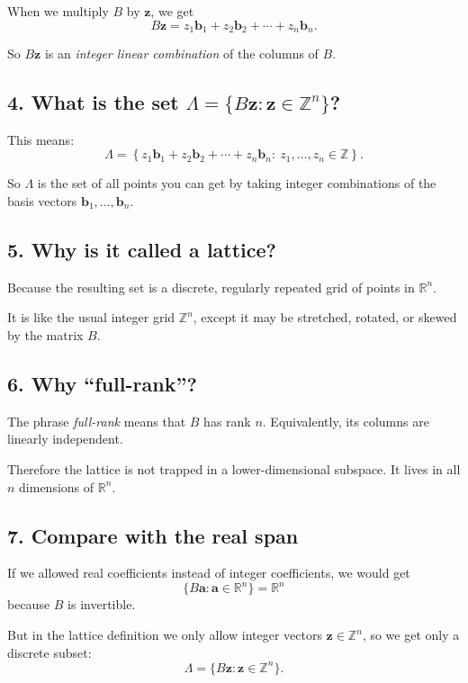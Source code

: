 \documentclass[12pt]{article}
\begin{document}
	When we multiply \(B\) by \(\mathbf{z}\), we get
	\[
	B\mathbf{z}
	=
	z_1\mathbf{b}_1+z_2\mathbf{b}_2+\cdots+z_n\mathbf{b}_n.
	\]
	
	So \(B\mathbf{z}\) is an \emph{integer linear combination} of the columns of \(B\).
	
	\subsection*{4. What is the set \(\Lambda=\{B\mathbf{z}:\mathbf{z}\in\mathbb{Z}^n\}\)?}
	
	This means:
	\[
	\Lambda
	=
	\left\{
	z_1\mathbf{b}_1+z_2\mathbf{b}_2+\cdots+z_n\mathbf{b}_n
	:\ z_1,\dots,z_n\in\mathbb{Z}
	\right\}.
	\]
	
	So \(\Lambda\) is the set of all points you can get by taking integer combinations of the basis vectors \(\mathbf{b}_1,\dots,\mathbf{b}_n\).
	
	\subsection*{5. Why is it called a lattice?}
	
	Because the resulting set is a discrete, regularly repeated grid of points in \(\mathbb{R}^n\).
	
	It is like the usual integer grid \(\mathbb{Z}^n\), except it may be stretched, rotated, or skewed by the matrix \(B\).
	
	\subsection*{6. Why ``full-rank''?}
	
	The phrase \emph{full-rank} means that \(B\) has rank \(n\). Equivalently, its columns are linearly independent.
	
	Therefore the lattice is not trapped in a lower-dimensional subspace. It lives in all \(n\) dimensions of \(\mathbb{R}^n\).
	
	\subsection*{7. Compare with the real span}
	
	If we allowed real coefficients instead of integer coefficients, we would get
	\[
	\{B\mathbf{a}:\mathbf{a}\in\mathbb{R}^n\}
	=
	\mathbb{R}^n
	\]
	because \(B\) is invertible.
	
	But in the lattice definition we only allow integer vectors \(\mathbf{z}\in\mathbb{Z}^n\), so we get only a discrete subset:
	\[
	\Lambda=\{B\mathbf{z}:\mathbf{z}\in\mathbb{Z}^n\}.
	\]
	
\end{document}
